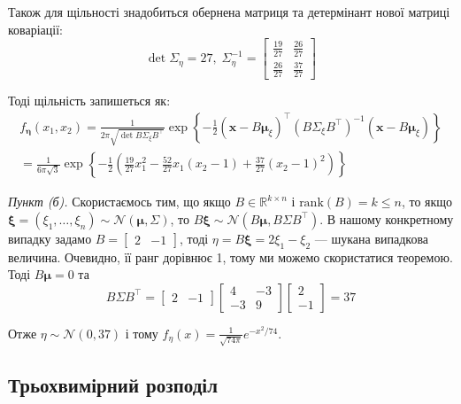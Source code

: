 \documentclass{hw_template}
\begin{document}
Також для щільності знадобиться обернена матриця та детермінант нової матриці коваріації:
\begin{equation*}
    \det \Sigma_{\eta} = 27, \; \Sigma_{\eta}^{-1} = \begin{bmatrix}
        \frac{19}{27} & \frac{26}{27} \\
        \frac{26}{27} & \frac{37}{27}
    \end{bmatrix}
\end{equation*}

Тоді щільність запишеться як:
\begin{align*}
    f_{\boldsymbol{\eta}}(x_1,x_2) = \frac{1}{2\pi\sqrt{\det B\Sigma_{\xi}B^{\top}}}\exp\left\{-\frac{1}{2}(\boldsymbol{x}-B\boldsymbol{\mu}_{\xi})^{\top}(B\Sigma_{\xi}B^{\top})^{-1}(\boldsymbol{x}-B\boldsymbol{\mu}_{\xi})\right\} \\
    = \frac{1}{6\pi\sqrt{3}}\exp\left\{-\frac{1}{2}\left(\frac{19}{27}x_1^2 - \frac{52}{27}x_1(x_2-1) + \frac{37}{27}(x_2-1)^2\right)\right\}
\end{align*}

\textit{Пункт (б).} Скористаємось тим, що якщо $B \in \mathbb{R}^{k \times n}$ і $\text{rank}(B) = k \leq n$, то якщо $\boldsymbol{\xi} = (\xi_1,\dots,\xi_n) \sim \mathcal{N}(\boldsymbol{\mu},\Sigma)$, то $B\boldsymbol{\xi} \sim \mathcal{N}(B\boldsymbol{\mu}, B\Sigma B^{\top})$. В нашому конкретному випадку задамо $B = \begin{bmatrix}
    2 & -1
\end{bmatrix}$, тоді $\eta = B\boldsymbol{\xi} = 2\xi_1-\xi_2$ --- шукана випадкова величина. Очевидно, її ранг дорівнює 1, тому ми можемо скористатися теоремою. Тоді $B\boldsymbol{\mu} = 0$ та
\begin{equation*}
    B\Sigma B^{\top} = \begin{bmatrix}
        2 & -1
    \end{bmatrix} \begin{bmatrix}
        4 & -3 \\ -3 & 9
    \end{bmatrix} \begin{bmatrix}
        2 \\ -1
    \end{bmatrix} = 37
\end{equation*}

Отже $\eta \sim \mathcal{N}(0, 37)$ і тому $f_{\eta}(x) = \frac{1}{\sqrt{74\pi}}e^{-x^2/74}$.

\subsection{Трьохвимірний розподіл}
\end{document}
